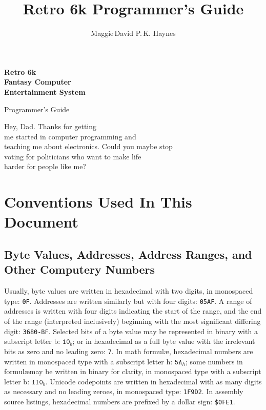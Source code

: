 \documentclass[12pt]{{memoir}}
\begin{document}
\title{Retro 6k Programmer's Guide}
\author{Maggie\,David P.\,K. Haynes}
\pagestyle{empty}
{\centering\sffamily\bfseries\Huge{}Retro 6k\\Fantasy Computer\\Entertainment System

Programmer's Guide\par}
{\centering\sffamily\bfseries\large\theauthor\par}
\cleartoverso
{}

\begin{center}
\noindent{}Hey, Dad. Thanks for getting \\
me started in computer programming and \\
teaching me about electronics. Could you maybe stop \\
voting for politicians who want to make life \\
harder for people like me?\par
\end{center}

\cleartorecto
\tableofcontents*
\clearpage
\pagestyle{headings}

\vspace*{3in}
\section*{Conventions Used In This Document}
\subsection{Byte Values, Addresses, Address Ranges, and Other Computery Numbers}

Usually, byte values are written in hexadecimal with two digits, in monospaced type: \texttt{0F}. Addresses are written similarly but with four digits: \texttt{05AF}. A range of addresses is written with four digits indicating the start of the range, and the end of the range (interpreted inclusively) beginning with the most significant differing digit: \texttt{3680-BF}. Selected bits of a byte value may be represented in binary with a subscript letter b: $\texttt{10}_b$; or in hexadecimal as a full byte value with the irrelevant bits as zero and no leading zero: \texttt{7}. In math formul\ae, hexadecimal numbers are written in monospaced type with a subscript letter h: $\texttt{5A}_h$; some numbers in formul\ae may be written in binary for clarity, in monospaced type with a subscript letter b: $\texttt{110}_b$. Unicode codepoints are written in hexadecimal with as many digits as necessary and no leading zeroes, in monospaced type: \texttt{1F9D2}. In assembly source listings, hexadecimal numbers are prefixed by a dollar sign: \texttt{\$0FE1}.
\end{document}
